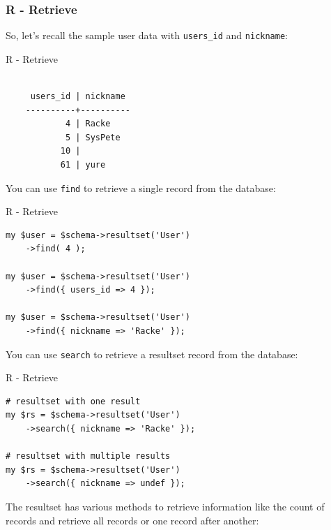 \subsubsection{R - Retrieve}

So, let's recall the sample user data with
\verb|users_id| and \verb|nickname|:

\begin{frame}[fragile]{R - Retrieve}
\begin{lstlisting}

     users_id | nickname
    ----------+----------
            4 | Racke
            5 | SysPete
           10 |
           61 | yure

\end{lstlisting}
\end{frame}

You can use \verb|find| to retrieve a single record from
the database:

\begin{frame}[fragile]{R - Retrieve}
\begin{lstlisting}
my $user = $schema->resultset('User')
    ->find( 4 );

my $user = $schema->resultset('User')
    ->find({ users_id => 4 });

my $user = $schema->resultset('User')
    ->find({ nickname => 'Racke' });
\end{lstlisting}
\end{frame}


You can use \verb|search| to retrieve a resultset record from
the database:

\begin{frame}[fragile]{R - Retrieve}
\begin{lstlisting}
# resultset with one result
my $rs = $schema->resultset('User')
    ->search({ nickname => 'Racke' });

# resultset with multiple results
my $rs = $schema->resultset('User')
    ->search({ nickname => undef });
\end{lstlisting}
\end{frame}

The resultset has various methods to retrieve information
like the count of records and retrieve all records or
one record after another:

